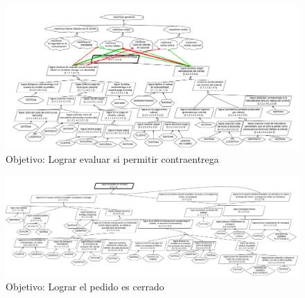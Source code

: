 \begin{figure}[ht]\begin{center}
  \includegraphics[angle=90,height=.9\textheight]{tp1/images/objetivos-permitir-contraentrega.pdf}
  \caption{Objetivo: Lograr evaluar si permitir contraentrega}
\end{center}\end{figure}

\begin{figure}[ht]\begin{center}
  \includegraphics[angle=90,height=.9\textheight]{tp1/images/objetivos-cerrar-pedido.pdf}
  \caption{Objetivo: Lograr el pedido es cerrado}
\end{center}\end{figure}
